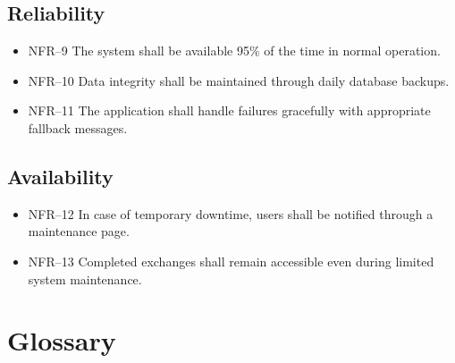 \documentclass[10pt,a4paper]{report}
\begin{document}
\subsection{Reliability}
\begin{itemize}
    \item NFR--9 The system shall be available 95\% of the time in normal operation.
    \item NFR--10 Data integrity shall be maintained through daily database backups.
    \item NFR--11 The application shall handle failures gracefully with appropriate fallback messages.
\end{itemize}

\subsection{Availability}
\begin{itemize}
    \item NFR--12 In case of temporary downtime, users shall be notified through a maintenance page.
    \item NFR--13 Completed exchanges shall remain accessible even during limited system maintenance.
\end{itemize}

\section{Glossary}
\end{document}
